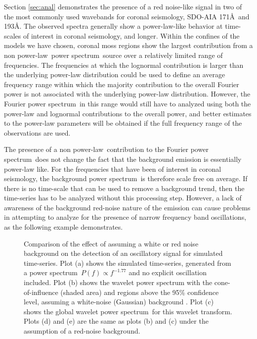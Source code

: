 \documentclass{aastex}
\newcommand{\PS}{power spectrum}
\newcommand{\PL}{power-law}
\newcommand{\Fps}{Fourier \PS}
\begin{document}
{Section \ref{sec:anal} demonstrates the presence of a red
noise-like signal in two of the most commonly used wavebands for
coronal seismology, SDO-AIA 171\AA\ and 193\AA.  The observed spectra
generally show a \PL-like behavior at time-scales of interest in
coronal seismology, and longer.  Within the confines of the models we
have chosen, coronal moss regions show the largest contribution from a
non \PL\ \PS\ source over a relatively limited range of
frequencies.  The frequencies at which the lognormal contribution is
larger than the underlying power-law distribution could be used to
define an average frequency range within which the majority
contribution to the overall Fourier power is not associated with the
underlying power-law distribution.  However, the \Fps\ in this range
would still have to analyzed using both the power-law and lognormal
contributions to the overall power, and better estimates to the
power-law parameters will be obtained if the full frequency range of
the observations are used.

The presence of a non \PL\ contribution to the \Fps\ does not change
the fact that the background emission is essentially power-law like.
For the frequencies that have been of interest in coronal seismology,
the background \PS\ is therefore scale free on average.  If there is
no time-scale that can be used to remove a background trend, then the
time-series has to be analyzed without this processing step.  However,
a lack of awareness of the background red-noise nature of the emission
can cause problems in attempting to analyze for the presence of narrow
frequency band oscillations, as the following example demonstrates.

\begin{figure}
\caption{Comparison of the effect of assuming a white or red noise
  background on the detection of an oscillatory signal for simulated
  time-series.  Plot (a) shows the simulated time-series, generated
  from a \protect\PS\ \protect$P(f)\propto f^{-1.77}$ and no
  explicit oscillation included.  Plot (b) shows the wavelet power
  spectrum with the cone-of-influence (shaded area) and regions above
  the 95\% confidence level, assuming a white-noise (Gaussian)
 background .  Plot (c) shows the global wavelet \protect\PS\ for
  this wavelet transform.  Plots (d) and (e) are the same as plots (b)
  and (c) under the assumption of a red-noise background.}
\label{fig:comparison}
\end{figure}

}
\end{document}
